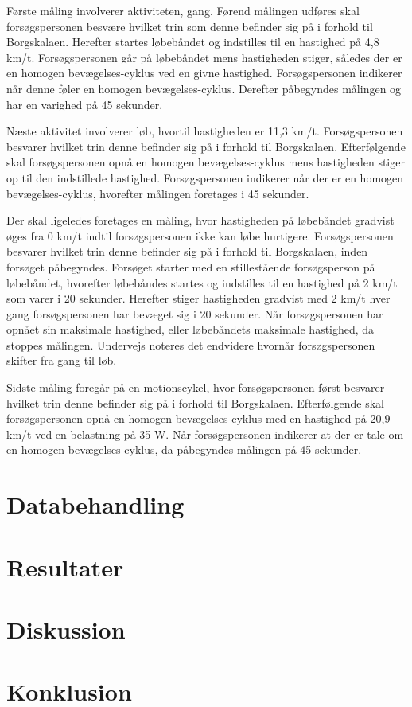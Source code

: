 Første måling involverer aktiviteten, gang. Førend målingen udføres skal forsøgspersonen besvære hvilket trin som denne befinder sig på i forhold til Borgskalaen. Herefter startes løbebåndet og indstilles til en hastighed på 4,8 km/t. Forsøgspersonen går på løbebåndet mens hastigheden stiger, således der er en homogen bevægelses-cyklus ved en givne hastighed. Forsøgspersonen indikerer når denne føler en homogen bevægelses-cyklus. Derefter påbegyndes målingen og har en varighed på 45 sekunder. 

Næste aktivitet involverer løb, hvortil hastigheden er 11,3 km/t. Forsøgspersonen besvarer hvilket trin denne befinder sig på i forhold til Borgskalaen. Efterfølgende skal forsøgspersonen opnå en homogen bevægelses-cyklus mens hastigheden stiger op til den indstillede hastighed. Forsøgspersonen indikerer når der er en homogen bevægelses-cyklus, hvorefter målingen foretages i 45 sekunder. 

Der skal ligeledes foretages en måling, hvor hastigheden på løbebåndet gradvist øges fra 0 km/t indtil forsøgspersonen ikke kan løbe hurtigere. Forsøgspersonen besvarer hvilket trin denne befinder sig på i forhold til Borgskalaen, inden forsøget påbegyndes. \newline
Forsøget starter med en stillestående forsøgsperson på løbebåndet, hvorefter løbebåndes startes og indstilles til en hastighed på 2 km/t som varer i 20 sekunder. Herefter stiger hastigheden gradvist med 2 km/t hver gang forsøgspersonen har bevæget sig i 20 sekunder. Når forsøgspersonen har opnået sin maksimale hastighed, eller løbebåndets maksimale hastighed, da stoppes målingen. Undervejs noteres det endvidere hvornår forsøgspersonen skifter fra gang til løb. 

Sidste måling foregår på en motionscykel, hvor forsøgspersonen først besvarer hvilket trin denne befinder sig på i forhold til Borgskalaen. Efterfølgende skal forsøgspersonen opnå en homogen bevægelses-cyklus med en hastighed på 20,9 km/t ved en belastning på 35 W. Når forsøgspersonen indikerer at der er tale om en homogen bevægelses-cyklus, da påbegyndes målingen på 45 sekunder. 


\section{Databehandling}

\section{Resultater}

\section{Diskussion}

\section{Konklusion}

